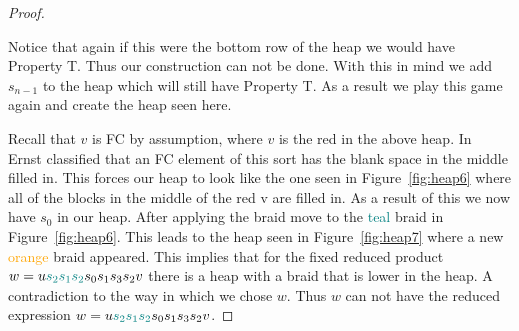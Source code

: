 \begin{theorem}
\begin{proof}
\begin{figure}[h!]
\begin{tikzpicture}[scale=0.5]
\end{tikzpicture}\label{fig:heap4}
\end{figure}

Notice that again if this were the bottom row of the heap we would have Property T. Thus our construction can not be done. With this in mind we add $s_{n-1}$ to the heap which will still have Property T. As a result we play this game again and create the heap seen here.\begin{figure}[h!] \centering
{}\label{fig:heap5}
\end{figure}
	
Recall that $v$ is FC by assumption, where $v$ is the \textcolor{rred}{red} in the above heap. In~\cite[Lemma 3.3]{Ernst2012c}	 Ernst classified that an FC element of this sort has the blank space in the middle filled in. This forces our heap to look like the one seen in Figure~\ref{fig:heap6} where all of the blocks in the middle of the red v are filled in. As a result of this we now have $s_0$ in our heap. After applying the braid move to the \textcolor{teal}{teal} braid in Figure~\ref{fig:heap6}. This leads to the heap seen in Figure~\ref{fig:heap7} where a new \textcolor{orange}{orange} braid appeared. This implies that for the fixed reduced product $w=u\textcolor{teal}{s_2s_1s_2}s_0s_1s_3s_2v$ there is a heap with a braid that is lower in the heap. A contradiction to the way in which we chose $w$. Thus $w$ can not have the reduced expression $w=u\textcolor{teal}{s_2s_1s_2}s_0s_1s_3s_2v$.


\end{proof}
\end{theorem}
